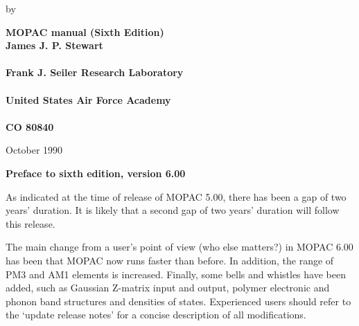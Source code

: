 \topmargin 0pt
\headheight 12pt %
\headsep 25pt    %
\footskip 30pt   %
\footheight 12pt %
\oddsidemargin  0.25in  %
\evensidemargin 0.125in %
\textwidth 5.875in
\marginparwidth 0.8in %
\marginparsep   11pt %
\baselineskip
\advance\textheight by \topskip

\begin{titlepage}
\begin{center}
{\huge\bf MOPAC manual (Sixth Edition)}\\
\vfill
{\LARGE\bf James J. P. Stewart}\\
\ \\
{\Large\bf Frank J. Seiler Research Laboratory\\
\ \\
United States Air Force Academy\\
\ \\
CO 80840}

\vfill

{\Large\sf October 1990}
\end{center}
\end{titlepage}


\begin{center}{\Large\bf Preface to sixth edition, version 6.00}\end{center}

      As indicated at the time of release of MOPAC  5.00,  there  has
 been  a  gap of two years' duration.  It is likely that a second gap
 of two years' duration will follow this release.

      The main change from a user's point of view (who else matters?)
 in  MOPAC  6.00 has been that MOPAC now runs faster than before.  In
 addition, the range of PM3 and AM1 elements is increased.   Finally,
 some  bells  and whistles have been added, such as Gaussian Z-matrix
 input and output, polymer electronic and phonon band structures  and
 densities  of states.  Experienced users should refer to the `update
 release notes' for a concise description of all modifications.



